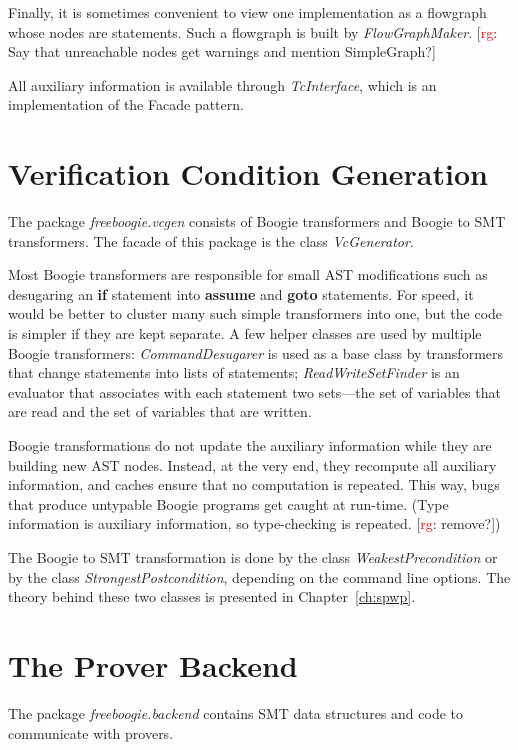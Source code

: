 \documentclass{llncs}
\newcommand{\rg}[1]{{\small [\textcolor{red}{rg}: #1]}}
\begin{document}
Finally, it is sometimes convenient to view one implementation as a
flowgraph whose nodes are statements. Such a flowgraph is built by
\textit{FlowGraphMaker}. \rg{Say that unreachable nodes get warnings and
mention SimpleGraph?}

All auxiliary information is available through
\textit{TcInterface}, which is an implementation of the Facade
pattern.

\section{Verification Condition Generation} %

The package \textit{freeboogie.vcgen} consists of Boogie
transformers and Boogie to SMT transformers. The facade of this
package is the class \textit{VcGenerator}.

Most Boogie transformers are responsible for small AST
modifications such as desugaring an \textbf{if} statement
into \textbf{assume} and \textbf{goto} statements. For speed,
it would be better to cluster many such simple transformers
into one, but the code is simpler if they are kept
separate. A few helper classes are used by multiple Boogie
transformers: \textit{CommandDesugarer} is used as a base class
by transformers that change statements into lists of statements;
\textit{ReadWriteSetFinder} is an evaluator that associates with
each statement two sets---the set of variables that are read and
the set of variables that are written.

Boogie transformations do not update the auxiliary information
while they are building new AST nodes. Instead, at the very end,
they recompute all auxiliary information, and caches ensure that
no computation is repeated. This way, bugs that produce untypable
Boogie programs get caught at run-time. (Type information is
auxiliary information, so type-checking is repeated. \rg{remove?})

The Boogie to SMT transformation is done by the
class \textit{WeakestPrecondition} or by the class
\textit{StrongestPostcondition}, depending on the command line
options. The theory behind these two classes is presented in
Chapter~\ref{ch:spwp}.

\section{The Prover Backend} %
\label{sec:backend}

The package \textit{freeboogie.backend} contains SMT data
structures and code to communicate with provers.
\end{document}
